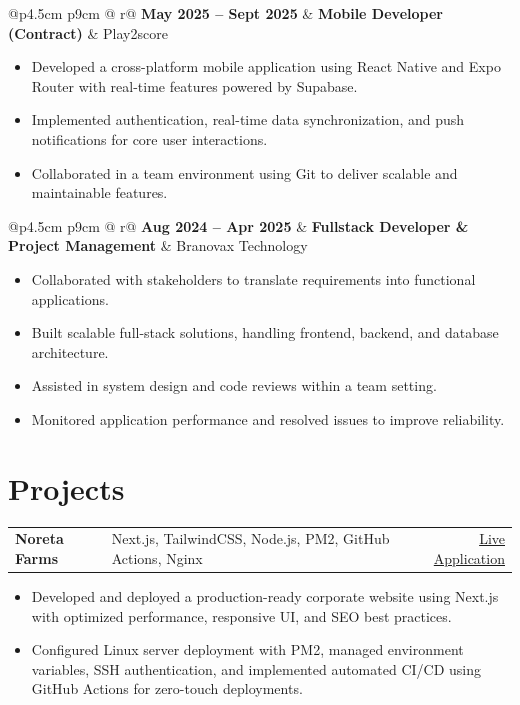 \documentclass{article}
\makeatletter
\newcommand{\contactinfo}[1]{{\fontsize{11pt}{13pt}\selectfont\color{black!70}#1}}
\newcommand{\cventry}[3]{%
    \noindent
    \begin{tabular*}{\linewidth}{@{}p{4.5cm} p{9cm} @{\extracolsep{\fill}} r@{}}
        \textbf{\small #1} & \textbf{#2} & {\color{primarycolor}\small #3}
    \end{tabular*}
}
\newcommand{\project}[3]{%
    \noindent
    \begin{tabular*}{\linewidth}{@{}p{5.5cm} p{10cm} @{\extracolsep{\fill}} r@{}}
        \textbf{#1} & {#2} & {\color{linkcolor}\small #3}
    \end{tabular*}
}
\makeatother
\begin{document}
\cventry{May 2025 -- Sept 2025}{Mobile Developer (Contract)}{Play2score}
\vspace{-0.4cm}
\begin{itemize}
    \item Developed a cross-platform mobile application using React Native and Expo Router with real-time features powered by Supabase.
    \item Implemented authentication, real-time data synchronization, and push notifications for core user interactions.
    \item Collaborated in a team environment using Git to deliver scalable and maintainable features.
\end{itemize}

\cventry{Aug 2024 -- Apr 2025}{Fullstack Developer \& Project Management}{Branovax Technology}
\vspace{-0.4cm}
\begin{itemize}
    \item Collaborated with stakeholders to translate requirements into functional applications.
    \item Built scalable full-stack solutions, handling frontend, backend, and database architecture.
    \item Assisted in system design and code reviews within a team setting.
    \item Monitored application performance and resolved issues to improve reliability.
\end{itemize}

\vspace{0.1cm}



\section{Projects}
\project{{Noreta Farms}}{ Next.js, TailwindCSS, Node.js, PM2, GitHub Actions, Nginx }{\contactinfo{ \href{https://noretafarms.com}{Live Application}}}
\vspace{-0.4cm}
\begin{itemize}
    \item Developed and deployed a production-ready corporate website using Next.js with optimized performance, responsive UI, and SEO best practices.
    \item Configured Linux server deployment with PM2, managed environment variables, SSH authentication, and implemented automated CI/CD using GitHub Actions for zero-touch deployments.
\end{itemize}
\end{document}

